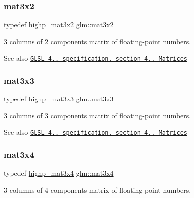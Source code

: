 \subsubsection{\texorpdfstring{mat3x2}{mat3x2}}
{\footnotesize\ttfamily typedef \hyperlink{group__core__precision_ga2188c0b772ac9d6210d46af34e04f375}{highp\+\_\+mat3x2} \hyperlink{group__core__types_gad7476e0e866186f12ee87975c6b01552}{glm\+::mat3x2}}

3 columns of 2 components matrix of floating-\/point numbers.

\begin{DoxySeeAlso}{See also}
\href{http://www.opengl.org/registry/doc/GLSLangSpec.4.20.8.pdf}{\tt G\+L\+SL 4.. specification, section 4.. Matrices} 
\end{DoxySeeAlso}
\mbox{\label{group__core__types_ga6fecca6a869070b6bf8acb44ce1c2af3}} 
\subsubsection{\texorpdfstring{mat3x3}{mat3x3}}
{\footnotesize\ttfamily typedef \hyperlink{group__core__precision_ga83105b0c326393a133a43c426aae2a9c}{highp\+\_\+mat3x3} \hyperlink{group__core__types_ga6fecca6a869070b6bf8acb44ce1c2af3}{glm\+::mat3x3}}

3 columns of 3 components matrix of floating-\/point numbers.

\begin{DoxySeeAlso}{See also}
\href{http://www.opengl.org/registry/doc/GLSLangSpec.4.20.8.pdf}{\tt G\+L\+SL 4.. specification, section 4.. Matrices} 
\end{DoxySeeAlso}
\mbox{\label{group__core__types_ga5524ae15d7fc00a68b8e0e3a0733cc2a}} 
\subsubsection{\texorpdfstring{mat3x4}{mat3x4}}
{\footnotesize\ttfamily typedef \hyperlink{group__core__precision_ga201566a8dbec6e27bec9e8e96ed4cdb6}{highp\+\_\+mat3x4} \hyperlink{group__core__types_ga5524ae15d7fc00a68b8e0e3a0733cc2a}{glm\+::mat3x4}}

3 columns of 4 components matrix of floating-\/point numbers.

